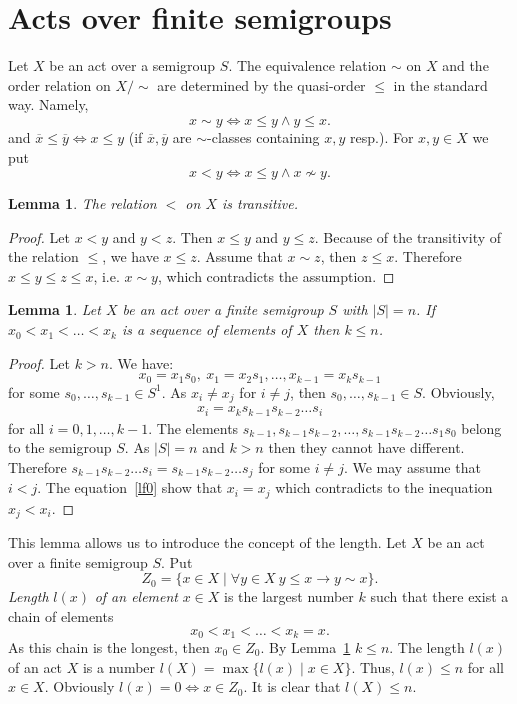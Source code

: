 \documentclass{birkau}
\numberwithin{equation}{section}
\theoremstyle{plain}
\newtheorem{lemma}[theorem]{Lemma}
\theoremstyle{definition}
\begin{document}
	\section{Acts over finite semigroups}
	
	Let $X$ be an act over a semigroup $S$. The equivalence relation $\sim$ on $X$ and the order relation on $X/{\sim}$ are determined by the quasi-order $\leqslant$ in the standard way. Namely, $$ x \sim y \Leftrightarrow x \leqslant y \wedge y \leqslant x. $$ and $\overline{x} \leqslant \overline{y} \Leftrightarrow x \leqslant y $ (if $\overline{x}, \overline{y}$ are ${\sim}$-classes containing $x,y$ resp.).
	For $x,y \in X$ we put $$ x < y \Leftrightarrow x \leqslant y \wedge x \nsim y. $$
	
	\begin{lemma} \label{lemma:03}
	    The relation $<$ on $X$ is transitive.
	\end{lemma}
	\begin{proof}
	    Let $x < y$ and $y < z$. Then $x \leqslant y$ and $y \leqslant z$. Because of the transitivity of the relation $\leqslant$, we have $x \leqslant z$. Assume that $x \sim z$, then $z \leqslant x$. Therefore $x \leqslant y \leqslant z \leqslant x$, i.e. $x \sim y$, which contradicts the assumption.
	\end{proof}
	
	\begin{lemma} \label{lemma:04}
	    Let $X$ be an act over a finite semigroup $S$ with $|S| = n$. If $x_0 < x_1 < \ldots < x_k$ is a sequence of elements of $X$ then $k \leqslant n$.
	\end{lemma}
	\begin{proof}
	    Let $k > n$. We have: $$x_0 = x_1 s_0,\ x_1 = x_2s_1, \ldots , x_{k-1} = x_k s_{k-1}$$ for some $s_0,\ldots,s_{k-1} \in S^1$. As $x_i \neq x_j$ for $i \neq j$, then $ s_0,\ldots,s_{k-1} \in S$. Obviously,
		\begin{gather}
			x_i = x_k s_{k-1} s_{k-2} \ldots s_i \label{lf0}
		\end{gather}
		for all $i = 0,1,\ldots,k-1$. The elements $s_{k-1},s_{k-1}s_{k-2},\ldots,s_{k-1}s_{k-2}\ldots s_1s_0$ belong to the semigroup $S$. As $|S| = n$ and $k>n$ then they cannot have different. Therefore $s_{k-1}s_{k-2}\ldots s_i = s_{k-1}s_{k-2}\ldots s_j$ for some $i\neq j$. We may assume that $i < j$. The equation~\eqref{lf0} show that $x_i = x_j$ which contradicts to the inequation $x_j < x_i$.
	\end{proof}
	
	This lemma allows us to introduce the concept of the length. Let $X$ be an act over a finite semigroup $S$. Put $$ Z_0 = \{ x \in X \mid \forall y \in X \ y \leqslant x \rightarrow y \sim x \}.$$ \textit{Length} $l(x)$ \textit{of an element} $x \in X$ is the largest number $k$ such that there exist a chain of elements $$x_0 < x_1 < \ldots < x_k=x.$$ As this chain is the longest, then $x_0 \in Z_0$. By Lemma~\ref{lemma:04} $k \leqslant n$. The length $l(x)$ of an act $X$ is a number $l(X) = \max \{ l(x) \mid x \in X\}$. Thus, $l(x) \leqslant n$ for all $x \in X$. Obviously $l(x) = 0 \Leftrightarrow x \in Z_0$. It is clear that $l(X) \leqslant n$.
	
\end{document}
